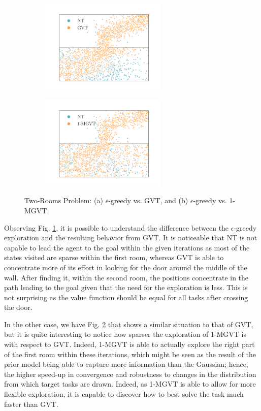 \documentclass{article}
\begin{document}
\begin{figure}[b]
  \begin{subfigure}[b]{0.45\textwidth}
    \includegraphics[trim=0.5cm 0.5cm 1.5cm 1.3cm,clip=true,height=4.5cm]{images/three-room-app/nt_vs_gvt.png}
    \caption{}
    \label{fig:nt-vs-gvt}
  \end{subfigure}
  \begin{subfigure}[b]{0.45\textwidth}
    \includegraphics[trim=0.5cm 0.5cm 1.5cm 1.3cm,clip=true,height=4.5cm]{images/three-room-app/nt_vs_mgvt.png}
    \caption{}
    \label{fig:nt-vs-mgvt}
  \end{subfigure}
  \caption{Two-Rooms Problem: (a)  $\epsilon$-greedy vs. GVT, and (b) $\epsilon$-greedy vs. 1-MGVT}
  \label{fig:rooms-expl}
\end{figure}

Observing Fig. \ref{fig:nt-vs-gvt}, it is possible to understand the difference between the $\epsilon$-greedy exploration and the resulting behavior from GVT. It is noticeable that NT is not capable to lead the agent to the goal within the given iterations as most of the states visited are sparse within the first room, whereas GVT is able to concentrate more of its effort in looking for the door around the middle of the wall. After finding it, within the second room, the positions concentrate in the path leading to the goal given that the need for the exploration is less. This is not surprising as the value function should be equal for all tasks after crossing the door. 

In the other case, we have Fig. \ref{fig:nt-vs-mgvt} that shows a similar situation to that of GVT, but it is quite interesting to notice how sparser the exploration of 1-MGVT is with respect to GVT. Indeed, 1-MGVT is able to actually explore the right part of the first room within these iterations, which might be seen as the result of the prior model being able to capture more information than the Gaussian; hence, the higher speed-up in convergence and robustness to changes in the distribution from which target tasks are drawn. Indeed, as 1-MGVT is able to allow for more flexible exploration, it is capable to discover how to best solve the task much faster than GVT.
\end{document}
